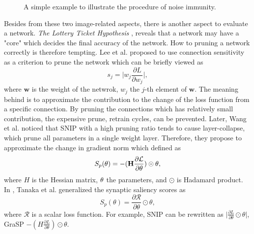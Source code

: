 \documentclass[sigconf]{acmart}
\begin{document}
    \begin{figure*}[tb]
        \vspace{-\baselineskip}
        \caption{A simple example to illustrate the procedure of noise immunity.}
        \label{fig:ni}
        \centering
        \vspace{-\baselineskip}
    \end{figure*}

    Besides from these two image-related aspects, there is another aspect to evaluate  
    a network. 
    \textit{The Lottery Ticket Hypothesis} \cite{frankle2019lottery}, reveals that a 
    network may have a "core" which decides the final accuracy of the network. 
    How to pruning a network correctly is therefore tempting. Lee et al. 
    \cite{lee2019snip} proposed to use connection sensitivity as a criterion to prune 
    the network which can be briefly viewed as 
    \begin{equation}
        \label{equ:snip_connection_sensitivity}
        s_j=\lvert w_j\frac{\partial L}{\partial w_j}\rvert,
    \end{equation}
    where $\textbf{w}$ is the weight of the netwrok, $w_j$ the $j$-th element of 
    $\textbf{w}$. The meaning behind is to approximate the contribution 
    to the change of the loss function from a specific connection. By pruning the 
    connections which has relatively small contribution, the expensive prune, retrain 
    cycles, can be prevented. 
    Later, Wang et al. \cite{wang2020picking} noticed that SNIP with a high pruning ratio 
    tends to cause layer-collapse, which prune all parameters in a single weight layer. 
    Therefore, they propose to approximate the change in gradient norm which defined as 
    \begin{equation}
        \label{equ:grap}
        S_p(\bf{\theta})=-(H\frac{\partial \mathcal L}{\partial \bf{\theta}})\odot\bf{\theta},
    \end{equation}
    where $H$ is the Hessian matrix, $\bf{\theta}$ the parameters, and $\odot$ is Hadamard product. 
    In \cite{tanaka2020pruning}, Tanaka et al. generalized the synaptic saliency scores as 
    \begin{equation}
        \label{equ:synflow}
        S_p(\theta)=\frac{\partial \mathcal R}{\partial \theta}\odot\theta,
    \end{equation}
    where $\mathcal R$ is a scalar loss function. 
    For example, SNIP can be rewritten as $\lvert\frac{\partial L}{\partial \theta}\odot\theta\rvert$, 
    GraSP $-(H\frac{\partial L}{\partial \theta})\odot\theta$. 
    
\end{document}
